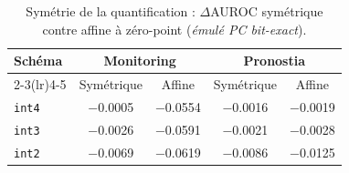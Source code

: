 \begin{table}[htbp]
\centering
\caption{Symétrie de la quantification : $\Delta$AUROC symétrique contre affine à zéro-point (\emph{émulé PC bit-exact}).}
\label{tab:annex-symmetry}
\begin{tabular}{lcccc}
\toprule
Schéma & \multicolumn{2}{c}{Monitoring} & \multicolumn{2}{c}{Pronostia} \\
\cmidrule(lr){2-3}\cmidrule(lr){4-5}
 & Symétrique & Affine & Symétrique & Affine \\
\midrule
\texttt{int4} & \num{-0.0005} & \num{-0.0554} & \num{-0.0016} & \num{-0.0019} \\
\texttt{int3} & \num{-0.0026} & \num{-0.0591} & \num{-0.0021} & \num{-0.0028} \\
\texttt{int2} & \num{-0.0069} & \num{-0.0619} & \num{-0.0086} & \num{-0.0125} \\
\bottomrule
\end{tabular}
\end{table}
